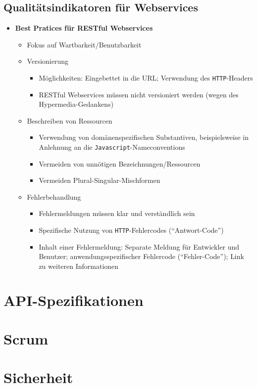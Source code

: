 \subsection{Qualitätsindikatoren für Webservices}
\begin{itemize}
	\item \textbf{Best Pratices für RESTful Webservices}
	\begin{itemize}
		\item Fokus auf Wartbarkeit/Benutzbarkeit
		\item Versionierung
		\begin{itemize}
			\item Möglichkeiten: Eingebettet in die URL; Verwendung des \texttt{HTTP}-Headers
			\item RESTful Webservices müssen nicht versioniert werden (wegen des Hypermedia-Gedankens)
		\end{itemize}
		\item Beschreiben von Ressourcen
		\begin{itemize}
			\item Verwendung von domänenspezifischen Substantiven, beispielsweise in Anlehnung an die \texttt{Javascript}-Nameconventions
			\item Vermeiden von unnötigen Bezeichnungen/Ressourcen
			\item Vermeiden Plural-Singular-Mischformen
		\end{itemize}
		\item Fehlerbehandlung
		\begin{itemize}
			\item Fehlermeldungen müssen klar und verständlich sein
			\item Spezifische Nutzung von \texttt{HTTP}-Fehlercodes ("`Antwort-Code"')
			\item Inhalt einer Fehlermeldung: Separate Meldung für Entwickler und Benutzer; anwendungsspezifischer Fehlercode ("`Fehler-Code"'); Link zu weiteren Informationen
		\end{itemize}
	\end{itemize}
\end{itemize}



\section{API-Spezifikationen}



\section{Scrum}



\section{Sicherheit}
